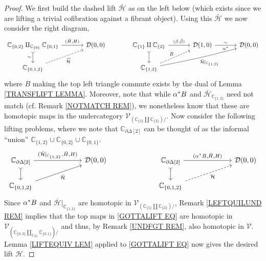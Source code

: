 \documentclass[a4paper,10pt
,draft
]{article}%
\numberwithin{equation}{section}
\numberwithin{figure}{section}
\theoremstyle{definition} %
\newcommand{\V}{\ensuremath{\mathcal V}}
\newcommand{\1}{\ensuremath{\mathbbm 1}}%
\begin{document}
\begin{proof}
	We first build the dashed lift $\bar{\mathcal{H}}$
	as on the left below (which exists since we are lifting a trivial cofibration against a fibrant object).
	Using this $\bar{\mathcal{H}}$ we now consider the right diagram,
	\begin{equation}
	\begin{tikzcd}[column sep = 35pt]
	\mathbb{C}_{\{0,2\}} 
	\amalg_{\mathbb{C}_{\{0\}}}
	\mathbb{C}_{\{0,1\}} 
	\ar[rightarrowtail]{d}[swap]{\sim}
	\arrow{r}{(\bar{H},H)}
	&
	\mathcal{D}(0,0)
	&%
	\mathbb{C}_{\{1\}} \amalg \mathbb{C}_{\{2\}}
	\ar[rightarrowtail]{d}
	\arrow{r}{(\beta,\bar{\beta})}
	&
	\mathcal{D}(1,0)
	\ar{r}{\sim}[swap]{\alpha^{\**}}
	&
	\mathcal{D}(0,0) 
	\\
	\mathbb{C}_{\{0,1,2\}}
	\arrow[dashed]{ur}[swap]{\widetilde{\mathcal{H}}}
	&
	&%
	\mathbb{C}_{\{1,2\}}
	\ar[dashed]{ru}{B}
	\ar[bend right=2]{rru}[swap]{\bar{\mathcal{H}}|_{\mathbb{C}_{\{1,2\}}}}
	&
	&
	\end{tikzcd}
	\end{equation}
	where $B$ making the top left triangle commute exists by the dual of Lemma \ref{TRANSFLIFT LEMMA}.
	Moreover, note that while 
	$\alpha^{\**}B$ and $\bar{\mathcal{H}}_{\mathbb{C}_{\{1,2\}}}$
	need not match (cf. Remark \ref{NOTMATCH REM}),
	we nonetheless know that these are homotopic maps
	in the undercategory $\V_{\left(\mathbb{C}_{\{1\}} \amalg \mathbb{C}_{\{2\}}\right)/}$.
	Now consider the following lifting problems, 
	where we note that $\mathbb{C}_{\partial \Delta[2]}$ 
	can be thought of as the informal ``union''
	$\mathbb{C}_{\{1,2\}} \cup \mathbb{C}_{\{0,2\}} \cup \mathbb{C}_{\{0,1\}}$.
	\begin{equation}\label{GOTTALIFT EQ}
	\begin{tikzcd}[column sep = 65pt]
	\mathbb{C}_{\partial \Delta[2]}
	\ar[rightarrowtail]{d}
	\arrow{r}{(\bar{\mathcal{H}}|_{\mathbb{C}_{\{1,2\}}},\bar{H},H)}
	&
	\mathcal{D}(0,0)
	&%
	\mathbb{C}_{\partial \Delta[2]}
	\ar[rightarrowtail]{d}
	\arrow{r}{(\alpha^{\**}B,\bar{H},H)}
	&
	\mathcal{D}(0,0)
	\\
	\mathbb{C}_{\{0,1,2\}} \ar{ru}[swap]{\bar{\mathcal{H}}}
	&
	&%
	\mathbb{C}_{\{0,1,2\}} \ar[dashed]{ru}[swap]{\mathcal{H}}
	&
	\end{tikzcd}
	\end{equation}
	Since $\alpha^{\**}B$ and $\bar{\mathcal{H}}|_{\mathbb{C}_{\{1,2\}}}$
	are homotopic in 
	$\V_{\left(\mathbb{C}_{\{1\}} \amalg \mathbb{C}_{\{2\}}\right)/}$,
	Remark \ref{LEFTQUILUND REM}
	implies that the top maps in \eqref{GOTTALIFT EQ}
	are homotopic in 
	$\V_{\left(
		\mathbb{C}_{\{0,2\}} \amalg_{\mathbb{C}_{\{0\}}} \mathbb{C}_{\{0,1\}}
		\right)/}$ and thus,
	by Remark \ref{UNDFGT REM}, also homotopic in 
	$\V$.
	Lemma \ref{LIFTEQUIV LEM} applied to \eqref{GOTTALIFT EQ}
	now gives the desired lift $\mathcal{H}$.
\end{proof}
\end{document}
